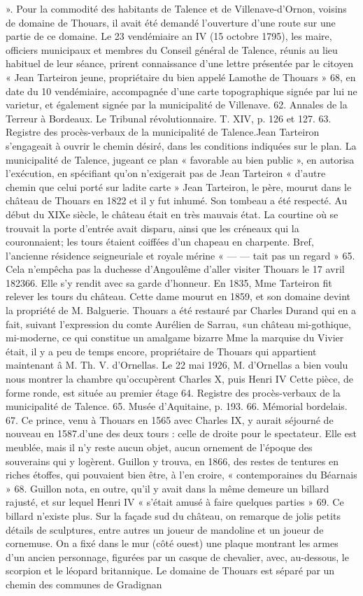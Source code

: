 ». Pour la commodité des habitants de Talence et de Villenave-d'Ornon, voisins de domaine de Thouars, il avait été demandé l'ouverture d'une route sur une partie de ce domaine. Le 23 vendémiaire an IV (15 octobre 1795), les maire, officiers municipaux et membres du Conseil général de Talence, réunis au lieu habituel de leur séance, prirent connaissance d'une lettre présentée par le citoyen « Jean Tarteiron jeune, propriétaire du bien appelé Lamothe de Thouars » 68, en date du 10 vendémiaire, accompagnée d'une carte topographique signée par lui ne varietur, et également signée par la municipalité de Villenave. 62. Annales de la Terreur à Bordeaux. Le Tribunal révolutionnaire. T. XIV, p. 126 et 127. 63. Registre des procès-verbaux de la municipalité de Talence.Jean Tarteiron s'engageait à ouvrir le chemin désiré, dans les conditions indiquées sur le plan. La municipalité de Talence, jugeant ce plan « favorable au bien public », en autorisa l'exécution, en spécifiant qu'on n'exigerait pas de Jean Tarteiron « d'autre chemin que celui porté sur ladite carte » Jean Tarteiron, le père, mourut dans le château de Thouars en 1822 et il y fut inhumé. Son tombeau a été respecté. Au début du XIXe siècle, le château était en très mauvais état. La courtine où se trouvait la porte d'entrée avait disparu, ainsi que les créneaux qui la couronnaient; les tours étaient coiffées d'un chapeau en charpente. Bref, l'ancienne résidence seigneuriale et royale mérine « — — tait pas un regard » 65. Cela n'empêcha pas la duchesse d'Angoulême d'aller visiter Thouars le 17 avril 182366. Elle s'y rendit avec sa garde d'honneur. En 1835, Mme Tarteiron fit relever les tours du château. Cette dame mourut en 1859, et son domaine devint la propriété de M. Balguerie. Thouars a été restauré par Charles Durand qui en a fait, suivant l'expression du comte Aurélien de Sarrau, «un château mi-gothique, mi-moderne, ce qui constitue un amalgame bizarre Mme la marquise du Vivier était, il y a peu de temps encore, propriétaire de Thouars qui appartient maintenant â M. Th. V. d'Ornellas. Le 22 mai 1926, M. d'Ornellas a bien voulu nous montrer la chambre qu'occupèrent Charles X, puis Henri IV Cette pièce, de forme ronde, est située au premier étage 64. Registre des procès-verbaux de la municipalité de Talence. 65. Musée d'Aquitaine, p. 193. 66. Mémorial bordelais. 67. Ce prince, venu à Thouars en 1565 avec Charles IX, y aurait séjourné de nouveau en 1587.d'une des deux tours : celle de droite pour le spectateur. Elle est meublée, mais il n'y reste aucun objet, aucun ornement de l'époque des souverains qui y logèrent. Guillon y trouva, en 1866, des restes de tentures en riches étoffes, qui pouvaient bien être, à l'en croire, « contemporaines du Béarnais » 68. Guillon nota, en outre, qu'il y avait dans la même demeure un billard rajusté, et sur lequel Henri IV « s'était amusé à faire quelques parties » 69. Ce billard n'existe plus. Sur la façade sud du château, on remarque de jolis petits détails de sculptures, entre autres un joueur de mandoline et un joueur de cornemuse. On a fixé dans le mur (côté ouest) une plaque montrant les armes d'un ancien personnage, figurées par un casque de chevalier, avec, au-dessous, le scorpion et le léopard britannique. Le domaine de Thouars est séparé par un chemin des communes de Gradignan 